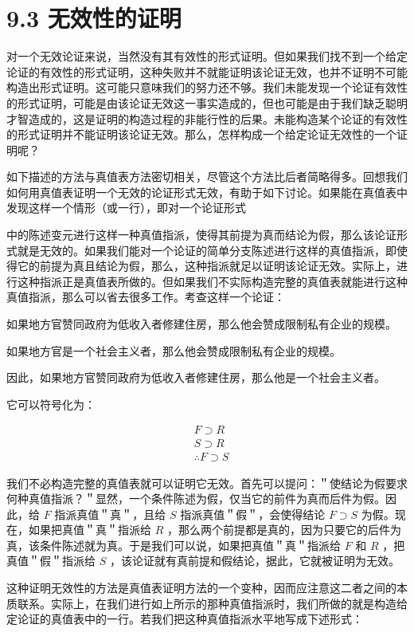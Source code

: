 \section*{9.3 无效性的证明}
对一个无效论证来说，当然没有其有效性的形式证明。但如果我们找不到一个给定论证的有效性的形式证明，这种失败并不就能证明该论证无效，也并不证明不可能构造出形式证明。这可能只意味我们的努力还不够。我们未能发现一个论证有效性的形式证明，可能是由该论证无效这一事实造成的，但也可能是由于我们缺乏聪明才智造成的，这是证明的构造过程的非能行性的后果。未能构造某个论证的有效性的形式证明并不能证明该论证无效。那么，怎样构成一个给定论证无效性的一个证明呢？

如下描述的方法与真值表方法密切相关，尽管这个方法比后者简略得多。回想我们如何用真值表证明一个无效的论证形式无效，有助于如下讨论。如果能在真值表中发现这样一个情形（或一行），即对一个论证形式

中的陈述变元进行这样一种真值指派，使得其前提为真而结论为假，那么该论证形式就是无效的。如果我们能对一个论证的简单分支陈述进行这样的真值指派，即使得它的前提为真且结论为假，那么，这种指派就足以证明该论证无效。实际上，进行这种指派正是真值表所做的。但如果我们不实际构造完整的真值表就能进行这种真值指派，那么可以省去很多工作。考查这样一个论证：

如果地方官赞同政府为低收入者修建住房，那么他会赞成限制私有企业的规模。

如果地方官是一个社会主义者，那么他会赞成限制私有企业的规模。

因此，如果地方官赞同政府为低收入者修建住房，那么他是一个社会主义者。

它可以符号化为：

$$
\begin{aligned}
& F \supset R \\
& S \supset R \\
& \therefore F \supset S
\end{aligned}
$$

我们不必构造完整的真值表就可以证明它无效。首先可以提问：＂使结论为假要求何种真值指派？＂显然，一个条件陈述为假，仅当它的前件为真而后件为假。因此，给 $F$ 指派真值＂真＂，且给 $S$ 指派真值＂假＂，会使得结论 $F \supset S$ 为假。现在，如果把真值＂真＂指派给 $R$ ，那么两个前提都是真的，因为只要它的后件为真，该条件陈述就为真。于是我们可以说，如果把真值＂真＂指派给 $F$ 和 $R$ ，把真值＂假＂指派给 $S$ ，该论证就有真前提和假结论，据此，它就被证明为无效。

这种证明无效性的方法是真值表证明方法的一个变种，因而应注意这二者之间的本质联系。实际上，在我们进行如上所示的那种真值指派时，我们所做的就是构造给定论证的真值表中的一行。若我们把这种真值指派水平地写成下述形式：

